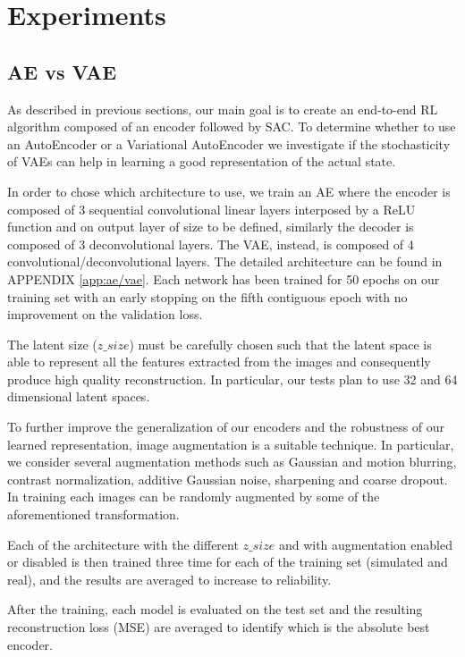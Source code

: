 \chapter{Experiments}

\section{AE vs VAE}

As described in previous sections, our main goal is to create an end-to-end RL algorithm composed of an encoder followed by SAC. To determine whether to use an AutoEncoder or a Variational AutoEncoder we investigate if the stochasticity of VAEs can help in learning a good representation of the actual state. 

In order to chose which architecture to use, we train an AE where the encoder is composed of 3 sequential convolutional linear layers interposed by a ReLU function and on output layer of size to be defined, similarly the decoder is composed of 3 deconvolutional layers. The VAE, instead, is composed of 4 convolutional/deconvolutional layers. The detailed architecture can be found in APPENDIX \ref{app:ae/vae}. Each network has been trained for 50 epochs on our training set with an early stopping on the fifth contiguous epoch with no improvement on the validation loss.

The latent size ($z\_size$) must be carefully chosen such that the latent space is able to represent all the features extracted from the images and consequently produce high quality reconstruction. In particular, our tests plan to use 32 and 64 dimensional latent spaces. 

To further improve the generalization of our encoders and the robustness of our learned representation, image augmentation is a suitable technique. In particular, we consider several augmentation methods such as Gaussian and motion blurring, contrast normalization, additive Gaussian noise, sharpening and coarse dropout. In training each images can be randomly augmented by some of the aforementioned transformation. 

Each of the architecture with the different $z\_size$ and with augmentation enabled or disabled is then trained three time for each of the training set (simulated and real), and the results are averaged to increase to reliability. 

After the training, each model is evaluated on the test set and the resulting reconstruction loss (MSE) are averaged to identify which is the absolute best encoder. 

